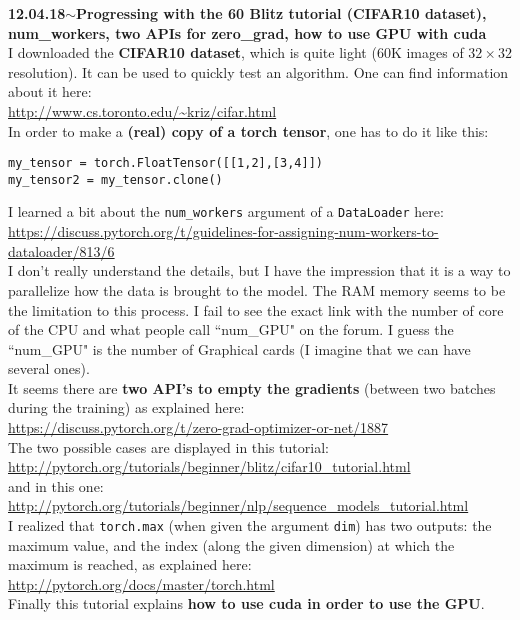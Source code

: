 \documentclass[11pt,a4paper]{article}
\newenvironment{loggentry}[2]%
{\noindent\textbf{#1}\hspace{1cm}$\mathbf{\sim}$\text{ }\textbf{#2}\\}{\vspace{0.5cm}}
\begin{document}
\begin{loggentry}{12.04.18}{Progressing with the 60 Blitz tutorial (CIFAR10 dataset), num\_workers, two APIs for zero\_grad, how to use GPU with cuda}
I downloaded the \textbf{CIFAR10 dataset}, which is quite light (60K images of $32\times 32$ resolution). It can be used to quickly test an algorithm. One can find information about it here:\\
\url{http://www.cs.toronto.edu/~kriz/cifar.html}\\
In order to make a \textbf{(real) copy of a torch tensor}, one has to do it like this:\\
\begin{verbatim}
my_tensor = torch.FloatTensor([[1,2],[3,4]])
my_tensor2 = my_tensor.clone()
\end{verbatim}
I learned a bit about the \texttt{num\_workers} argument of a \texttt{DataLoader} here:\\
\url{https://discuss.pytorch.org/t/guidelines-for-assigning-num-workers-to-dataloader/813/6}\\
I don't really understand the details, but I have the impression that it is a way to parallelize how the data is brought to the model. The RAM memory seems to be the limitation to this process. I fail to see the exact link with the number of core of the CPU and what people call ``num\_GPU" on the forum. I guess the ``num\_GPU" is the number of Graphical cards (I imagine that we can have several ones).\\
It seems there are \textbf{two API's to empty the gradients} (between two batches during the training) as explained here:\\
\url{https://discuss.pytorch.org/t/zero-grad-optimizer-or-net/1887}\\
The two possible cases are displayed in this tutorial:\\
\url{http://pytorch.org/tutorials/beginner/blitz/cifar10_tutorial.html}\\
and in this one:\\
\url{http://pytorch.org/tutorials/beginner/nlp/sequence_models_tutorial.html}\\
I realized that \texttt{torch.max} (when given the argument \texttt{dim}) has two outputs: the maximum value, and the index (along the given dimension) at which the maximum is reached, as explained here:\\
\url{http://pytorch.org/docs/master/torch.html}\\
Finally this tutorial explains \textbf{how to use cuda in order to use the GPU}.
\end{loggentry}
\end{document}
